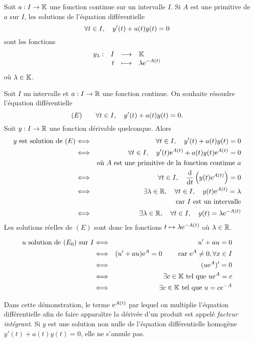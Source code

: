\documentclass{magnolia}
\begin{document}
\begin{proposition}[utile=-3]
Soit $a:I\to\mathbb{K}$ une fonction continue sur un intervalle $I$. Si $A$ est
une primitive de $a$ sur $I$, les solutions de l'équation différentielle
\[\forall t\in I ,\quad y'(t)+a(t)y(t)=0\]
sont les fonctions
\[\begin{array}[t]{lrcl} \displaystyle{y_\lambda} : & \displaystyle{I} & \longrightarrow & \displaystyle{\ensuremath{\mathbb{K}}} \\ & \displaystyle{t} & \longmapsto & \displaystyle{\lambda {\rm e}^{-A(t)}} \end{array}\]
où $\lambda\in\mathbb{K}$.
\end{proposition}

\begin{preuve}
\begin{francois}
Soit $I$ un intervalle et $a:I\to\mathbb{R}$ une fonction continue. On souhaite résoudre l'équation différentielle
\[(E)\qquad\forall t\in I,\quad y'(t)+a(t)y(t)=0.\]
Soit $y:I\to\mathbb{R}$ une fonction dérivable quelconque. Alors
\begin{eqnarray*}
\text{$y$ est solution de $(E)$}
&\Longleftrightarrow& \forall t\in I,\quad y'(t)+a(t)y(t)=0\\
&\Longleftrightarrow& \forall t\in I,\quad y'(t){\rm e}^{A(t)}+a(t)y(t){\rm e}^{A(t)}=0\\
&    & \text{où $A$ est une primitive de la fonction continue $a$}\\
&\Longleftrightarrow& \forall t\in I,\quad \frac{{\rm d}}{{\rm d}t}\left(y(t){\rm e}^{A(t)}\right)=0\\
&\Longleftrightarrow& \exists \lambda\in\mathbb{R},\quad\forall t\in I,\quad y(t){\rm e}^{A(t)}=\lambda\\
&    & \text{car $I$ est un intervalle}\\
&\Longleftrightarrow& \exists \lambda\in\mathbb{R},\quad\forall t\in I,\quad y(t)=\lambda{\rm e}^{-A(t)}
\end{eqnarray*}
Les solutions réelles de $(E)$ sont donc les fonctions $t\mapsto \lambda {\rm e}^{-A(t)}$
où $\lambda\in\mathbb{R}$.
\end{francois}
\begin{victor}
\begin{eqnarray*}
u \text{ solution de } (E_0) \text{ sur } I&\Longleftrightarrow & u'+au=0 \\
&\Longleftrightarrow & (u'+au){\rm e}^A=0 \qquad\text{ car } {\rm e}^A\neq 0, \forall x \in I \\
&\Longleftrightarrow &(u{\rm e}^A)'=0\\
&\Longleftrightarrow & \exists c\in \mathbb{K} \text{ tel que } ue^A=c\\
&\Longleftrightarrow & \exists c\in \mathbb{K} \text{ tel que } u=ce^{-A}
\end{eqnarray*}
\end{victor}
\end{preuve}

\begin{remarques}
\remarque Dans cette démonstration, le terme ${\rm e}^{A(t)}$ par lequel on multiplie l'équation différentielle afin de faire apparaître la dérivée d'un produit est appelé \emph{facteur intégrant}.
\remarque Si $y$ est une solution non nulle de l'équation différentielle homogène $y'(t)+a(t) y(t)=0$, elle ne s'annule pas.
\end{remarques}
\end{document}
